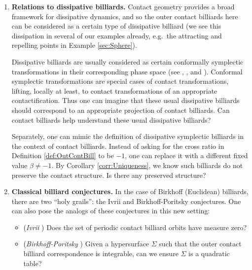 \documentclass{article}
\begin{document}
\begin{enumerate}
    \item \textbf{Relations to dissipative billiards.} Contact geometry provides a broad 
    framework for dissipative dynamics, and so the outer contact billiards here can be 
    considered as a certain type of dissipative billiard (we see this dissipation in 
    several of our examples already, e.g.~the attracting and repelling points in Example 
    \ref{sec:Sphere}). 
    
    Dissipative billiards are usually considered as certain conformally symplectic 
    transformations in their corresponding phase space (see \cite{pinball}, 
    \cite{dissipative-billiards}, and \cite{diss-symp}). Conformal symplectic 
    transformations are special cases of contact transformations, lifting, locally at 
    least, to contact transformations of an appropriate contactification. Thus one can 
    imagine that these usual dissipative billiards should correspond to an appropriate 
    projection of contact billiards. Can contact billiards help understand these usual 
    dissipative billiards?

    Separately, one can mimic the definition of dissipative symplectic billiards in the context of contact billiards. Instead of asking for the cross ratio in Definition \ref{def:OutContBill} to be $-1$, one can replace it with a different fixed value $\beta \neq -1$. By Corollary \ref{corr:Uniqueness}, we know such billiards do not preserve the contact structure. Is there any preserved structure?
    
    
    \item \textbf{Classical billiard conjectures.} In the case of Birkhoff (Euclidean) 
    billiards, there are two ``holy grails'': the Ivrii and Birkhoff-Poritsky conjectures. 
    One can also pose the analogs of these conjectures in this new setting:
    \begin{itemize}
        \item (\textit{Ivrii} \cite{ivrii}) Does the set of periodic contact billiard 
        orbits have measure zero?
        \item (\textit{Birkhoff-Poritsky} \cite{birkhoff-poritsky}) Given a hypersurface 
        $\Sigma$ such that the outer contact billiard correspondence is integrable, can we 
        ensure $\Sigma$ is a quadratic table? 
    \end{itemize}
      

\end{enumerate}
\end{document}
